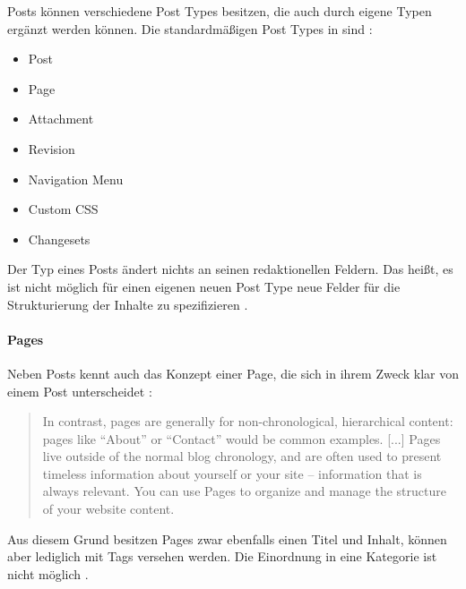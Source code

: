             Posts können verschiedene Post Types besitzen,
            die auch durch eigene Typen ergänzt werden können.
            Die standardmäßigen Post Types in {\wordpress} sind
            \cite{wordpress:PostTypes}:

            \begin{itemize}
                \item Post
                \item Page
                \item Attachment
                \item Revision
                \item Navigation Menu
                \item Custom CSS
                \item Changesets
            \end{itemize}

            Der Typ eines Posts ändert nichts an seinen redaktionellen Feldern.
            Das heißt, es ist nicht möglich für einen eigenen neuen Post Type
            neue Felder für die Strukturierung der Inhalte zu spezifizieren
            \cite{wordpress:Posts, wordpress:PostTypes}.

            \paragraph*{Pages}
            Neben Posts kennt {\wordpress} auch das Konzept einer Page,
            die sich in ihrem Zweck klar von einem Post unterscheidet
            \cite{wordpress:Pages}:

            \begin{quote}
                In contrast, pages are generally for non-chronological,
                hierarchical content: pages like "`About"' or "`Contact"'
                would be common examples.
                [...]
                Pages live outside of the normal blog chronology,
                and are often used to present timeless information about
                yourself or your site -- information that is always relevant.
                You can use Pages to organize and manage the structure of your website content.
            \end{quote}

            Aus diesem Grund besitzen Pages zwar ebenfalls einen Titel und Inhalt,
            können aber lediglich mit Tags versehen werden.
            Die Einordnung in eine Kategorie ist nicht möglich
            \cite{wordpress:Pages}.


